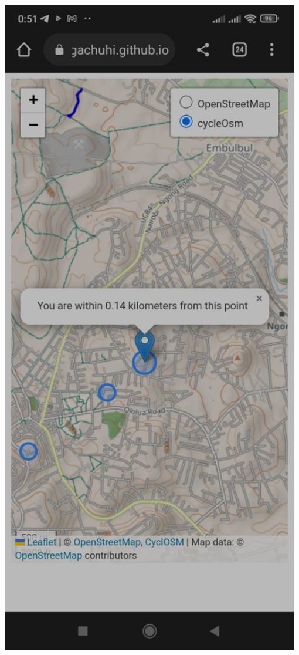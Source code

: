 \documentclass[
]{book}
\begin{document}
\includegraphics[width=8in]{../images/mobile-app}
\end{document}
